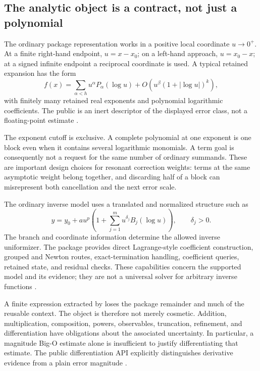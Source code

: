 \documentclass[11pt,a4paper]{article}
\newcommand{\code}[1]{\texttt{\detokenize{#1}}}
\begin{document}
\subsection{The analytic object is a contract, not just a polynomial}

The ordinary package representation works in a positive local coordinate \(u\to0^+\). At a finite right-hand endpoint, \(u=x-x_0\); on a left-hand approach, \(u=x_0-x\); at a signed infinite endpoint a reciprocal coordinate is used. A typical retained expansion has the form
\begin{equation}
 f(x)=\sum_{\alpha<h}u^\alpha P_\alpha(\log u)
       +O\!\left(u^\beta(1+|\log u|)^k\right),
\label{eq:jet}
\end{equation}
with finitely many retained real exponents and polynomial logarithmic coefficients. The public \code{PowerLogRemainder[u,beta,k]} is an inert descriptor of the displayed error class, not a floating-point estimate \cite{core,readme}.

The exponent cutoff is exclusive. A complete polynomial at one exponent is one block even when it contains several logarithmic monomials. A term goal is consequently not a request for the same number of ordinary summands. These are important design choices for resonant correction weights: terms at the same asymptotic weight belong together, and discarding half of a block can misrepresent both cancellation and the next error scale.

The ordinary inverse model uses a translated and normalized structure such as
\begin{equation}
 y=y_0+a u^p\left(1+\sum_{j=1}^{m}u^{\delta_j}B_j(\log u)\right),
 \qquad \delta_j>0.
\end{equation}
The branch and coordinate information determine the allowed inverse uniformizer. The package provides direct Lagrange-style coefficient construction, grouped and Newton routes, exact-termination handling, coefficient queries, retained state, and residual checks. These capabilities concern the supported model and its evidence; they are not a universal solver for arbitrary inverse functions \cite{core,readme,statusref}.

A finite expression extracted by \code{Normal} loses the package remainder and much of the reusable context. The object is therefore not merely cosmetic. Addition, multiplication, composition, powers, observables, truncation, refinement, and differentiation have obligations about the associated uncertainty. In particular, a magnitude Big-O estimate alone is insufficient to justify differentiating that estimate. The public differentiation API explicitly distinguishes derivative evidence from a plain error magnitude \cite{core}.
\end{document}
